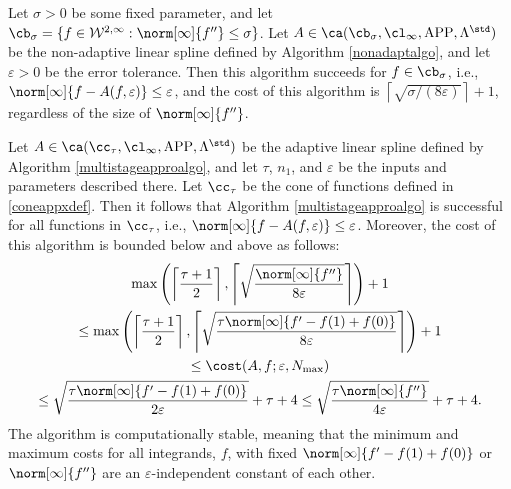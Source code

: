 \begin{theorem} \label{multistageappxthm} 
Let $\sigma >0$ be some fixed parameter, and let $\cb_{\sigma}=\{f \in  \mathcal{W}^{2,\infty} : \norm[\infty]{f''}\leq \sigma\}$. Let $A \in \ca(\cb_{\sigma}, \cl_{\infty}, \APP, \Lambda^{\std})$ be the non-adaptive linear spline defined by Algorithm \ref{nonadaptalgo}, and let $\varepsilon>0$ be the error tolerance. Then this algorithm succeeds for $f \in \cb_{\sigma}$, i.e., $\norm[\infty]{f - A(f,\varepsilon)} \le \varepsilon$, and the cost of this algorithm is $\left \lceil \sqrt{\sigma/(8\varepsilon)}\right \rceil + 1$, regardless of the size of $\norm[\infty]{f''}$.

Let $A \in \ca(\cc_{\tau}, \cl_{\infty}, \APP, \Lambda^{\std})$ be the adaptive linear spline defined by Algorithm \ref{multistageapproalgo}, and let $\tau$, $n_1$, and $\varepsilon$ be the inputs and parameters described there. Let $\cc_\tau$ be the cone of functions defined in \eqref{coneappxdef}.  Then it follows that Algorithm \ref{multistageapproalgo} is successful for all functions in $\cc_{\tau}$,  i.e.,  $\norm[\infty]{f - A(f,\varepsilon)} \le \varepsilon$.  Moreover, the cost of this algorithm is bounded below and above as follows:
\begin{multline}
\max \left(\left \lceil\frac{\tau+1}{2} \right \rceil, \left \lceil \sqrt{\frac{ \norm[\infty]{f''}}{8\varepsilon}} \right \rceil \right) +1 \\
\le \max \left(\left \lceil\frac{\tau+1}{2} \right \rceil, \left \lceil \sqrt{\frac{\tau \norm[\infty]{f'-f(1)+f(0)}}{8\varepsilon}} \right \rceil \right) +1 \\
\le
\cost(A,f;\varepsilon,N_{\max}) \\
\le \sqrt{\frac{\tau \norm[\infty]{f'-f(1)+f(0)}}{2\varepsilon}} + \tau + 4
\le \sqrt{\frac{\tau \norm[\infty]{f''} }{4\varepsilon}} + \tau + 4.
\end{multline}
The algorithm is computationally stable, meaning that the minimum and maximum costs for all integrands, $f$, with fixed $\norm[\infty]{f'-f(1)+f(0)}$ or $\norm[\infty]{f''}$ are an $\varepsilon$-independent constant of each other.
\end{theorem}

